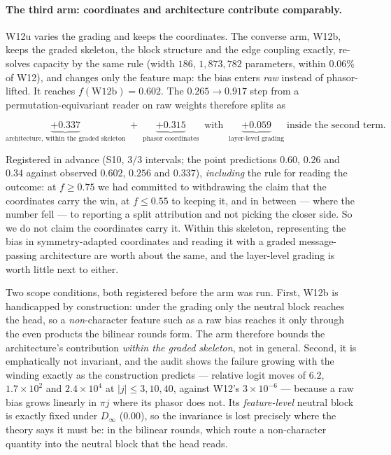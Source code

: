 \documentclass[10pt,letterpaper]{article}
\theoremstyle{definition}
\newcommand{\Dinf}{D_\infty}
\begin{document}
\paragraph{The third arm: coordinates and architecture contribute comparably.} W12u varies the
grading and keeps the coordinates. The converse arm, W12b, keeps the graded skeleton, the block
structure and the edge coupling exactly, re-solves capacity by the same rule (width $186$,
$1{,}873{,}782$ parameters, within $0.06\%$ of W12), and changes only the feature map: the bias
enters \emph{raw} instead of phasor-lifted. It reaches $f(\mathrm{W12b}) = \mathbf{0.602}$. The
$0.265 \to 0.917$ step from a permutation-equivariant reader on raw weights therefore splits as

\[
\underbrace{+0.337}_{\text{architecture, within the graded skeleton}}
\;+\;
\underbrace{+0.315}_{\text{phasor coordinates}}
\;\;\text{with}\;\;
\underbrace{+0.059}_{\text{layer-level grading}}\;\text{inside the second term.}
\]

Registered in advance (S10, $3/3$ intervals; the point predictions $0.60$, $0.26$ and $0.34$ against
observed $0.602$, $0.256$ and $0.337$), \emph{including} the rule for reading the outcome: at
$f \ge 0.75$ we had committed to withdrawing the claim that the coordinates carry the win, at
$f \le 0.55$ to keeping it, and in between --- where the number fell --- to reporting a split
attribution and not picking the closer side. So we do not claim the coordinates carry it. Within
this skeleton, representing the bias in symmetry-adapted coordinates and reading it with a graded
message-passing architecture are worth about the same, and the layer-level grading is worth little
next to either.

Two scope conditions, both registered before the arm was run. First, W12b is handicapped by
construction: under the grading only the neutral block reaches the head, so a \emph{non}-character
feature such as a raw bias reaches it only through the even products the bilinear rounds form. The
arm therefore bounds the architecture's contribution \emph{within the graded skeleton}, not in
general. Second, it is emphatically not invariant, and the audit shows the failure growing with the
winding exactly as the construction predicts --- relative logit moves of $6.2$, $1.7\times10^2$ and
$2.4\times10^4$ at $|j| \le 3, 10, 40$, against W12's $3\times10^{-6}$ --- because a raw bias grows
linearly in $\pi j$ where its phasor does not. Its \emph{feature-level} neutral block is exactly
fixed under $\Dinf$ ($0.00$), so the invariance is lost precisely where the theory says it must be:
in the bilinear rounds, which route a non-character quantity into the neutral block that the head
reads.
\end{document}
